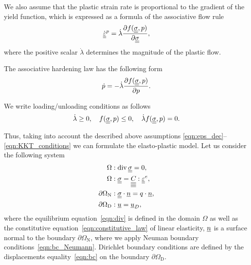 \documentclass[12pt]{article}
\begin{document}
We also assume that the plastic strain rate is proportional to the gradient of the yield function, which is expressed as a formula of the associative flow rule
\begin{equation}\label{eqn:flow_rule1}
    \dot{\underline{\underline{\varepsilon}}}^p = \dot{\lambda} \frac{\partial f(\underline{\underline{\sigma}}, p)}{\partial \underline{\underline{\sigma}}}, 
\end{equation}
where the positive scalar $\dot{\lambda}$ determines the magnitude of the plastic flow.

The associative hardening law has the following form
\begin{equation}
    \dot{p} = -\dot{\lambda}\frac{\partial f(\underline{\underline{\sigma}}, p)}{\partial p}.
\end{equation}


We write loading/unloading conditions as follows
\begin{equation}\label{eqn:KKT_conditions}
    \dot{\lambda} \geq 0, \quad f(\underline{\underline{\sigma}}, p) \leq 0, \quad \dot{\lambda}f(\underline{\underline{\sigma}}, p) = 0.
\end{equation}

Thus, taking into account the described above assumptions \eqref{eqn:eps_dec}--\eqref{eqn:KKT_conditions} we can formulate the elasto-plastic model. Let us consider the following system
\begin{align}
    \Omega &: \operatorname{div} \underline{\underline{\sigma}} = 0 , \label{eqn:div}\\
    \Omega &: \underline{\underline{\sigma}} = \underline{\underline{\underline{\underline{C_{}}}}} : \underline{\underline{\varepsilon}}^e, \label{eqn:constitutive_law}\\
    \partial\Omega_\text{N} &: \underline{\underline{\sigma}} \cdot \underline{n} = q \cdot \underline{n}, \label{eqn:bc_Neumann} \\
    \partial\Omega_\text{D} &: \underline{u} = \underline{u}_D, \label{eqn:bc}
\end{align}
where the equilibrium equation~\eqref{eqn:div} is defined in the domain $\Omega$ as well as the constitutive equation~\eqref{eqn:constitutive_law} of linear elasticity, $\underline{n}$ is a surface normal to the boundary $\partial\Omega_\text{N}$, where we apply Neuman boundary conditions~\eqref{eqn:bc_Neumann}. Dirichlet boundary conditions are defined by the displacements equality~\eqref{eqn:bc} on the boundary $\partial\Omega_\text{D}$.
\end{document}
